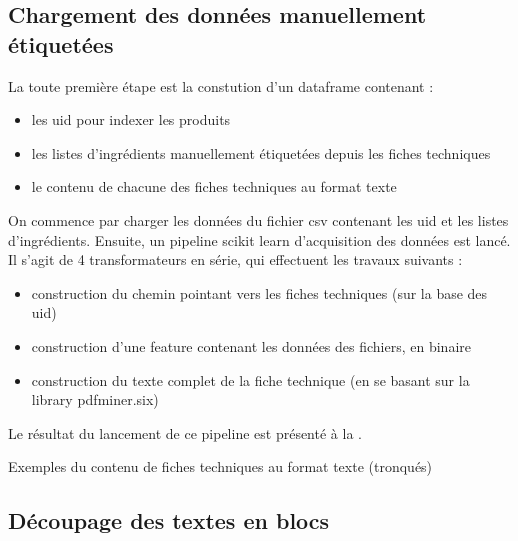         \subsection{Chargement des données manuellement étiquetées}

        La toute première étape est la constution d'un dataframe contenant : 
        \begin{itemize}
            \item les uid pour indexer les produits
            \item les listes d'ingrédients manuellement étiquetées depuis les fiches techniques
            \item le contenu de chacune des fiches techniques au format texte
        \end{itemize}
        On commence par charger les données du fichier csv contenant les uid et les listes d'ingrédients.
        Ensuite, un pipeline scikit learn d'acquisition des données est lancé.
        Il s'agit de 4 transformateurs en série, qui effectuent les travaux suivants :
        \begin{itemize}
            \item construction du chemin pointant vers les fiches techniques (sur la base des uid)
            \item construction d'une feature contenant les données des fichiers, en binaire
            \item construction du texte complet de la fiche technique (en se basant sur la library pdfminer.six)
        \end{itemize}
        Le résultat du lancement de ce pipeline est présenté à la .

        {\renewcommand{\arraystretch}{1.5}%
        \begin{table}[htbp]
            \begin{center}
            {\scriptsize
            
            }
            \caption{Exemples du contenu de fiches techniques au format texte (tronqués)}
            \label{tbl:mod_GT_fulltexts}
            \end{center}
        \end{table}
        }

        \subsection{Découpage des textes en blocs}

